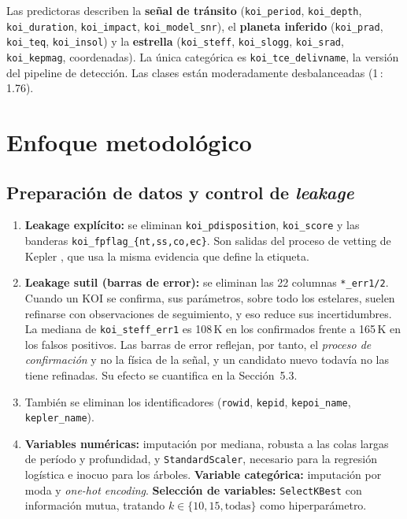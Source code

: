 \documentclass[11pt,a4paper]{article}
\begin{document}
\vspace{-2pt}
Las predictoras describen la \textbf{señal de tránsito} (\texttt{koi\_period}, \texttt{koi\_depth}, \texttt{koi\_duration}, \texttt{koi\_impact}, \texttt{koi\_model\_snr}), el \textbf{planeta inferido} (\texttt{koi\_prad}, \texttt{koi\_teq}, \texttt{koi\_insol}) y la \textbf{estrella} (\texttt{koi\_steff}, \texttt{koi\_slogg}, \texttt{koi\_srad}, \texttt{koi\_kepmag}, coordenadas). La única categórica es \texttt{koi\_tce\_delivname}, la versión del pipeline de detección. Las clases están moderadamente desbalanceadas (1\,:\,1.76).

\section{Enfoque metodológico}
\subsection{Preparación de datos y control de \textit{leakage}}
\begin{enumerate}
\item \textbf{Leakage explícito:} se eliminan \texttt{koi\_pdisposition}, \texttt{koi\_score} y las banderas \texttt{koi\_fpflag\_\{nt,ss,co,ec\}}. Son salidas del proceso de vetting de Kepler \cite{thompson2018}, que usa la misma evidencia que define la etiqueta.
\item \textbf{Leakage sutil (barras de error):} se eliminan las 22 columnas \texttt{*\_err1/2}. Cuando un KOI se confirma, sus parámetros, sobre todo los estelares, suelen refinarse con observaciones de seguimiento, y eso reduce sus incertidumbres. La mediana de \texttt{koi\_steff\_err1} es 108\,K en los confirmados frente a 165\,K en los falsos positivos. Las barras de error reflejan, por tanto, el \textit{proceso de confirmación} y no la física de la señal, y un candidato nuevo todavía no las tiene refinadas. Su efecto se cuantifica en la Sección~5.3.
\item También se eliminan los identificadores (\texttt{rowid}, \texttt{kepid}, \texttt{kepoi\_name}, \texttt{kepler\_name}).
\item \textbf{Variables numéricas:} imputación por mediana, robusta a las colas largas de período y profundidad, y \texttt{StandardScaler}, necesario para la regresión logística e inocuo para los árboles. \textbf{Variable categórica:} imputación por moda y \textit{one-hot encoding}. \textbf{Selección de variables:} \texttt{SelectKBest} con información mutua, tratando $k\in\{10,15,\text{todas}\}$ como hiperparámetro.
\end{enumerate}
\end{document}
